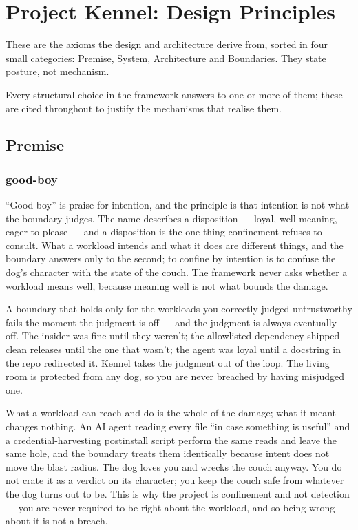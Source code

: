 \hypertarget{project-kennel-design-principles}{%
\chapter{Project Kennel: Design
Principles}\label{project-kennel-design-principles}}

These are the axioms the design and architecture derive from, sorted in
four small categories: Premise, System, Architecture and Boundaries.
They state posture, not mechanism.

Every structural choice in the framework answers to one or more of them;
these are cited throughout to justify the mechanisms that realise them.

\hypertarget{premise}{%
\section{Premise}\label{premise}}

\hypertarget{good-boy}{%
\subsection{\texorpdfstring{good-boy}{good-boy}}\label{good-boy}}

``Good boy'' is praise for intention, and the principle is that
intention is not what the boundary judges. The name describes a
disposition --- loyal, well-meaning, eager to please --- and a
disposition is the one thing confinement refuses to consult. What a
workload intends and what it does are different things, and the boundary
answers only to the second; to confine by intention is to confuse the
dog's character with the state of the couch. The framework never asks
whether a workload means well, because meaning well is not what bounds
the damage.

A boundary that holds only for the workloads you correctly judged
untrustworthy fails the moment the judgment is off --- and the judgment
is always eventually off. The insider was fine until they weren't; the
allowlisted dependency shipped clean releases until the one that wasn't;
the agent was loyal until a docstring in the repo redirected it. Kennel
takes the judgment out of the loop. The living room is protected from
any dog, so you are never breached by having misjudged one.

What a workload can reach and do is the whole of the damage; what it
meant changes nothing. An AI agent reading every file ``in case
something is useful'' and a credential-harvesting postinstall script
perform the same reads and leave the same hole, and the boundary treats
them identically because intent does not move the blast radius. The dog
loves you and wrecks the couch anyway. You do not crate it as a verdict
on its character; you keep the couch safe from whatever the dog turns
out to be. This is why the project is confinement and not detection ---
you are never required to be right about the workload, and so being
wrong about it is not a breach.

